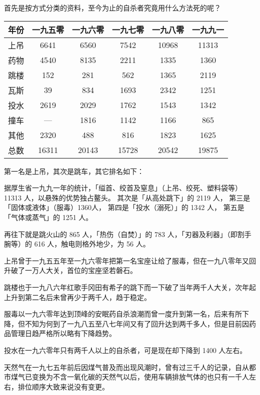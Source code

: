 \documentclass[UTF8]{ctexart}
\begin{document}
首先是按方式分类的资料，至今为止的自杀者究竟用什么方法死的呢？

\begin{table}[htbp]
\begin{center}
\begin{tabular}{cccccc}

\toprule
年份 & 一九五零 & 一九六零 & 一九七零 & 一九八零 & 一九九一 \\
\midrule
上吊 & 6641  & 6560  & 7542  & 10968 & 11313 \\
药物 & 4540  & 8135  & 2211  & 1335  & 1360  \\
跳楼 & 152   & 281   & 562   & 1365  & 2119  \\
瓦斯 & 39    & 834   & 1693  & 2342  & 1251  \\
投水 & 2619  & 2029  & 1762  & 1543  & 1342  \\
撞车 &   —  & 1816  & 1142  & 1166  & 865   \\
其他 & 2320  & 488   & 816   & 1823  & 1625  \\
\midrule
总数 & 16311 & 20143 & 15728 & 20542 & 19875 \\
\bottomrule
\end{tabular}
\end{center}
\end{table}

第一名是上吊，其次是跳车，其它排名如下：

据厚生省一九九一年的统计，「缢首、绞首及窒息」（上吊、绞死、塑料袋等）11313 人，以悬殊的优势独占鳌头。
其次是「从高处跳下」的 2119 人，
第三是「固体或液体」（服毒）1360人，
第四是「投水（溺死）」的 1342 人，
第五是「气体或蒸气」的 1251 人。

再往下就是跳火山的 865 人，「热伤（自焚）」的 783 人，「刃器及利器」（即割手腕等）的 616 人，触电则格外地少，为 56 人。

上吊曾于一九五五年至一九六零年把第一名宝座让给了服毒，但在一九八零年又回升破了一万人大关，首位的宝座坚若磐石。

跳楼也于一九八六年红歌手冈田有希子的跳下而一下破了当年两千人大关，次年起上升到第二名后未曾再少于两千人，趋于稳定。

服毒以一九六零年达到顶峰的安眠药自杀浪潮而曾一度升到第一名，后来有所下降，但不知为何到了一九八五至八七年间又有了回升达到两千多人，但是目前因药品管理日趋严格所以略有下降趋势。

投水在一九六零年只有两千人以上的自杀者，可是现在却下降到 1400 人左右。

天然气在一九七五年前后因煤气普及而出现风潮时，曾有过三千人的记录，自从都市煤气已变换为不含一氧化碳的天然气以后，使用车辆排放气体的也只有一千人左右，排位顺序大致来说没有变更。
\end{document}
